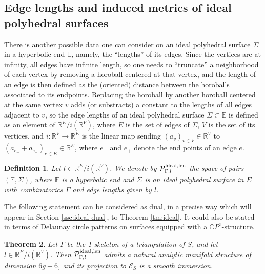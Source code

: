\documentclass[notitlepage,twoside,a4paper]{amsart}
\newcommand{\Pidlen}{\cP^{\rm ideal,len}_{\Gamma,l}}
\newtheorem{theorem}{\rm\bf Theorem}[section]
\newtheorem{definition}[theorem]{\rm\bf Definition}
\theoremstyle{named}
\newcommand{\CP}{{\mathbb CP}}
\newcommand{\R}{{\mathbb R}}
\newcommand{\cC}{{\mathcal C}}
\newcommand{\bE}{{\mathbb E}}
\newcommand{\cE}{{\mathcal E}}
\newcommand{\cP}{{\mathcal P}}
\begin{document}

\subsection{Edge lengths and induced metrics of ideal polyhedral surfaces}

There is another possible data one can consider on an ideal polyhedral surface $\Sigma$ in a hyperbolic end $\bE$, namely, the ``lengths'' of its edges. Since the vertices are at infinity, all edges have infinite length, so one needs to ``truncate'' a neighborhood of each vertex by removing a horoball centered at that vertex, and the length of an edge is then defined as the (oriented) distance between the horoballs associated to its endpoints. Replacing the horoball by another horoball centered at the same vertex $v$ adds (or substracts) a constant to the lengths of all edges adjacent to $v$, so the edge lengths of an ideal polyhedral surface $\Sigma\subset \bE$ is defined as an element of $\R^E/i(\R^V)$, where $E$ is the set of edges of $\Sigma$, $V$ is the set of its vertices, and $i:\R^V\to \R^E$ is the linear map sending $(a_v)_{v\in V}\in \R^V$ to $(a_{e_-}+a_{e_+})_{e\in E}\in \R^E$, where $e_-$ and $e_+$ denote the end points of an edge $e$.

\begin{definition}
  Let $l\in\R^E/i(\R^V)$. We denote by $\Pidlen$ the space of pairs $(\bE,\Sigma)$, where $\bE$ is a hyperbolic end and $\Sigma$ is an ideal polyhedral surface in $E$ with combinatorics $\Gamma$ and edge lengths given by $l$.
\end{definition}

The following statement can be considered as dual, in a precise way which will appear in Section \ref{ssc:ideal-dual}, to Theorem \ref{tm:ideal}. It could also be stated in terms of Delaunay circle patterns on surfaces equipped with a $\CP^1$-structure.

\begin{theorem} \label{tm:ideal*}
  Let $\Gamma$ be the 1-skeleton of a triangulation of $S$, and let $l\in \R^E/i(\R^V)$. Then $\Pidlen$ admits a natural analytic manifold structure of dimension $6g-6$, and its projection to $\cE_S$ is a smooth immersion. 
\end{theorem}
\end{document}
